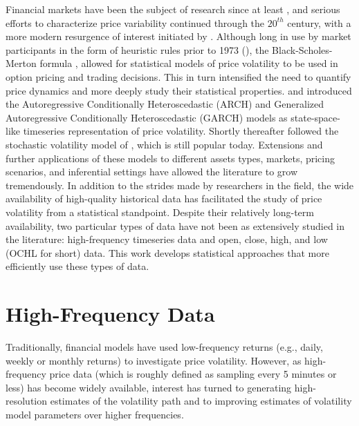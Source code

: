 \label{ch:introduction}

Financial markets have been the subject of research since at least
\cite{bachelier1900theorie}, and serious efforts to characterize price
variability continued through the $20^{th}$ century, with a more
modern resurgence of interest initiated by
\cite{mandelbrot1967variation}. Although long in use by market
participants in the form of heuristic rules prior to 1973
(\cite{haug2011option}), the Black-Scholes-Merton formula
\cite{black1973pricing}, \cite{merton1973theory} allowed for
statistical models of price volatility to be used in option pricing
and trading decisions. This in turn intensified the need to quantify
price dynamics and more deeply study their statistical
properties. \cite{engle1982} and \cite{bollerslev1986} introduced the
Autoregressive Conditionally Heteroscedastic (ARCH) and Generalized
Autoregressive Conditionally Heteroscedastic (GARCH) models as
state-space-like timeseries representation of price
volatility. Shortly thereafter followed the stochastic volatility
model of \cite{hull1987pricing}, which is still popular
today. Extensions and further applications of these models to
different assets types, markets, pricing scenarios, and inferential
settings have allowed the literature to grow tremendously. In addition
to the strides made by researchers in the field, the wide availability
of high-quality historical data has facilitated the study of price
volatility from a statistical standpoint. Despite their relatively
long-term availability, two particular types of data have not been as
extensively studied in the literature: high-frequency timeseries data
and open, close, high, and low (OCHL for short) data. This work
develops statistical approaches that more efficiently use these types
of data.

\section{High-Frequency Data}
Traditionally, financial models have used low-frequency returns (e.g.,
daily, weekly or monthly returns) to investigate price
volatility. However, as high-frequency price data (which is roughly
defined as sampling every 5 minutes or less) has become widely
available, interest has turned to generating high-resolution estimates
of the volatility path and to improving estimates of volatility model
parameters over higher frequencies.

